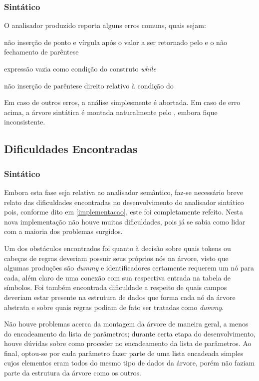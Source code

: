 \documentclass[
	article,			%
	11pt,				%
	oneside,			%
	a4paper,			%
	english,			%
	brazil,				%
	sumario=tradicional
	]{abntex2}
\renewcommand{\it}[1]{\textit{#1}}
\begin{document}
\subsubsection{Sintático}
O analisador produzido reporta alguns erros comuns, quais sejam:

\begin{itemize}{
		\item não inserção de ponto e vírgula após o valor a ser retornado pelo  e o não fechamento de parêntese 
		\item expressão vazia como condição do construto \it{while}
		\item não inserção de parêntese direito relativo à condição do 
	}
\end{itemize}
Em caso de outros erros, a análise simplesmente é abortada. Em caso de erro acima, a árvore sintática é montada naturalmente pelo , embora fique inconsistente.

\subsection {Dificuldades Encontradas}

\subsubsection{Sintático}
\label{difSintatico}
Embora esta fase seja relativa ao analisador semântico, faz-se necessário breve relato das dificuldades encontradas no desenvolvimento do analisador sintático pois, conforme dito em \ref{implementacao},
este foi completamente refeito. Nesta nova implementação não houve muitas dificuldades, pois já se sabia como lidar com a maioria dos problemas surgidos.

Um dos obstáculos encontrados foi quanto à decisão sobre quais tokens ou cabeças de regras deveriam possuir seus próprios nós na árvore, visto que algumas produções são \it{dummy} e identificadores certamente requerem um nó para cada, além claro de uma conexão com sua respectiva entrada na tabela de símbolos. Foi
também encontrada dificuldade a respeito de quais campos deveriam estar presente na estrutura de dados que forma cada nó da árvore abstrata e sobre quais regras podiam de fato ser tratadas como \it{dummy}.

Não houve problemas acerca da montagem da árvore de maneira geral, a menos do encadeamento da lista de parâmetros; durante certa etapa do desenvolvimento, houve dúvidas sobre como proceder no encadeamento da lista de parâmetros. Ao final, optou-se por cada parâmetro fazer parte de uma lista encadeada simples cujos elementos eram todos do mesmo tipo de dados da árvore, porém não faziam parte da estrutura da árvore como os outros.
\end{document}
